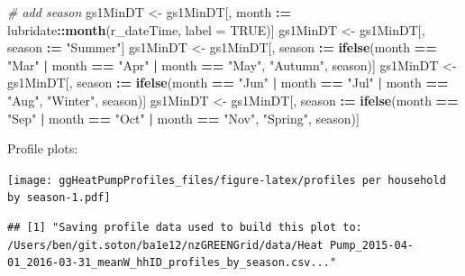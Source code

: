\documentclass[]{article}
\newenvironment{Shaded}{\begin{snugshade}}{\end{snugshade}}
\newcommand{\KeywordTok}[1]{\textcolor[rgb]{0.13,0.29,0.53}{\textbf{#1}}}
\newcommand{\DataTypeTok}[1]{\textcolor[rgb]{0.13,0.29,0.53}{#1}}
\newcommand{\StringTok}[1]{\textcolor[rgb]{0.31,0.60,0.02}{#1}}
\newcommand{\CommentTok}[1]{\textcolor[rgb]{0.56,0.35,0.01}{\textit{#1}}}
\newcommand{\OtherTok}[1]{\textcolor[rgb]{0.56,0.35,0.01}{#1}}
\newcommand{\OperatorTok}[1]{\textcolor[rgb]{0.81,0.36,0.00}{\textbf{#1}}}
\newcommand{\ErrorTok}[1]{\textcolor[rgb]{0.64,0.00,0.00}{\textbf{#1}}}
\newcommand{\NormalTok}[1]{#1}
\begin{document}
\begin{Shaded}
\begin{Highlighting}[]
\CommentTok{# add season}
\NormalTok{gs1MinDT <-}\StringTok{ }\NormalTok{gs1MinDT[, month }\OperatorTok{:}\ErrorTok{=}\StringTok{ }\NormalTok{lubridate}\OperatorTok{::}\KeywordTok{month}\NormalTok{(r_dateTime, }\DataTypeTok{label =} \OtherTok{TRUE}\NormalTok{)]}
\NormalTok{gs1MinDT <-}\StringTok{ }\NormalTok{gs1MinDT[, season }\OperatorTok{:}\ErrorTok{=}\StringTok{ "Summer"}\NormalTok{]}
\NormalTok{gs1MinDT <-}\StringTok{ }\NormalTok{gs1MinDT[, season }\OperatorTok{:}\ErrorTok{=}\StringTok{ }\KeywordTok{ifelse}\NormalTok{(month }\OperatorTok{==}\StringTok{ "Mar"} \OperatorTok{|}
\StringTok{                                              }\NormalTok{month }\OperatorTok{==}\StringTok{ "Apr"} \OperatorTok{|}
\StringTok{                                              }\NormalTok{month }\OperatorTok{==}\StringTok{ "May"}\NormalTok{, }\StringTok{"Autumn"}\NormalTok{, season)]}
\NormalTok{gs1MinDT <-}\StringTok{ }\NormalTok{gs1MinDT[, season }\OperatorTok{:}\ErrorTok{=}\StringTok{ }\KeywordTok{ifelse}\NormalTok{(month }\OperatorTok{==}\StringTok{ "Jun"} \OperatorTok{|}
\StringTok{                                              }\NormalTok{month }\OperatorTok{==}\StringTok{ "Jul"} \OperatorTok{|}
\StringTok{                                              }\NormalTok{month }\OperatorTok{==}\StringTok{ "Aug"}\NormalTok{, }\StringTok{"Winter"}\NormalTok{, season)]}
\NormalTok{gs1MinDT <-}\StringTok{ }\NormalTok{gs1MinDT[, season }\OperatorTok{:}\ErrorTok{=}\StringTok{ }\KeywordTok{ifelse}\NormalTok{(month }\OperatorTok{==}\StringTok{ "Sep"} \OperatorTok{|}
\StringTok{                                              }\NormalTok{month }\OperatorTok{==}\StringTok{ "Oct"} \OperatorTok{|}
\StringTok{                                              }\NormalTok{month }\OperatorTok{==}\StringTok{ "Nov"}\NormalTok{, }\StringTok{"Spring"}\NormalTok{, season)]}
\end{Highlighting}
\end{Shaded}

Profile plots:

\texttt{[image: ggHeatPumpProfiles\_files/figure-latex/profiles per household by season-1.pdf]}

\begin{verbatim}
## [1] "Saving profile data used to build this plot to: /Users/ben/git.soton/ba1e12/nzGREENGrid/data/Heat Pump_2015-04-01_2016-03-31_meanW_hhID_profiles_by_season.csv..."
\end{verbatim}
\end{document}
